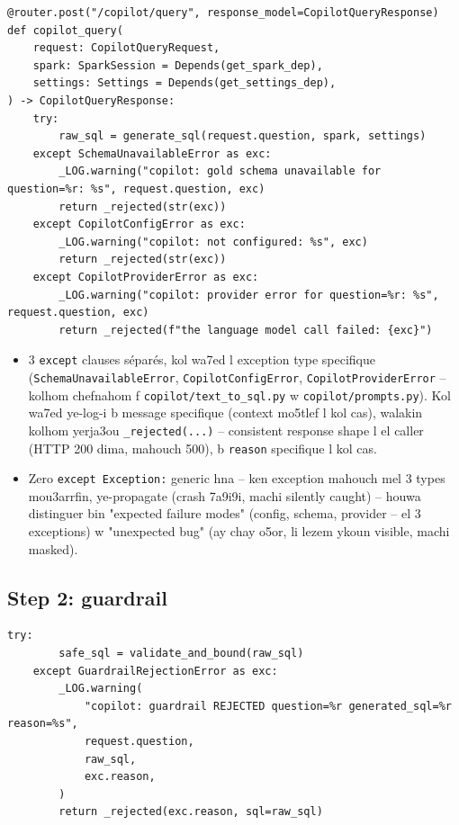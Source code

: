 \documentclass[11pt,a4paper]{report}
\DeclareRobustCommand{\code}[1]{\texttt{#1}}
\begin{document}
\begin{lstlisting}[style=pystyle]
@router.post("/copilot/query", response_model=CopilotQueryResponse)
def copilot_query(
    request: CopilotQueryRequest,
    spark: SparkSession = Depends(get_spark_dep),
    settings: Settings = Depends(get_settings_dep),
) -> CopilotQueryResponse:
    try:
        raw_sql = generate_sql(request.question, spark, settings)
    except SchemaUnavailableError as exc:
        _LOG.warning("copilot: gold schema unavailable for question=%r: %s", request.question, exc)
        return _rejected(str(exc))
    except CopilotConfigError as exc:
        _LOG.warning("copilot: not configured: %s", exc)
        return _rejected(str(exc))
    except CopilotProviderError as exc:
        _LOG.warning("copilot: provider error for question=%r: %s", request.question, exc)
        return _rejected(f"the language model call failed: {exc}")
\end{lstlisting}

\begin{itemize}
  \item 3 \code{except} clauses séparés, kol wa7ed l exception type
        specifique (\code{SchemaUnavailableError}, \code{CopilotConfigError},
        \code{CopilotProviderError} -- kolhom chefnahom f
        \code{copilot/text\_to\_sql.py} w \code{copilot/prompts.py}).
        Kol wa7ed ye-log-i b message specifique (context mo5tlef l kol
        cas), walakin kolhom yerja3ou \code{\_rejected(...)} -- consistent
        response shape l el caller (HTTP 200 dima, mahouch 500), b
        \code{reason} specifique l kol cas.
  \item Zero \code{except Exception:} generic hna -- ken exception
        mahouch mel 3 types mou3arrfin, ye-propagate (crash 7a9i9i,
        machi silently caught) -- houwa distinguer bin "expected failure
        modes" (config, schema, provider -- el 3 exceptions) w
        "unexpected bug" (ay chay o5or, li lezem ykoun visible, machi
        masked).
\end{itemize}

\subsection{Step 2: guardrail}

\begin{lstlisting}[style=pystyle]
    try:
        safe_sql = validate_and_bound(raw_sql)
    except GuardrailRejectionError as exc:
        _LOG.warning(
            "copilot: guardrail REJECTED question=%r generated_sql=%r reason=%s",
            request.question,
            raw_sql,
            exc.reason,
        )
        return _rejected(exc.reason, sql=raw_sql)
\end{lstlisting}
\end{document}
